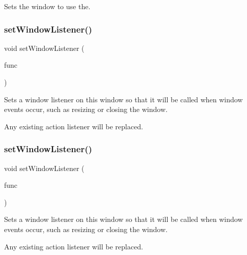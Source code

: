Sets the window to use the. 

\mbox{\label{classGWindow_adbb687462d07ac5bd49f3861e4356838}} 
\subsubsection{\texorpdfstring{set\+Window\+Listener()}{setWindowListener()}\hspace{0.1cm}{\footnotesize\ttfamily [1/2]}}
{\footnotesize\ttfamily void set\+Window\+Listener (\begin{DoxyParamCaption}\item[{G\+Event\+Listener}]{func }\end{DoxyParamCaption})\hspace{0.3cm}{\ttfamily [virtual]}}



Sets a window listener on this window so that it will be called when window events occur, such as resizing or closing the window. 

Any existing action listener will be replaced. \mbox{\label{classGWindow_a58b90463b205519917d5f68bdf068815}} 
\subsubsection{\texorpdfstring{set\+Window\+Listener()}{setWindowListener()}\hspace{0.1cm}{\footnotesize\ttfamily [2/2]}}
{\footnotesize\ttfamily void set\+Window\+Listener (\begin{DoxyParamCaption}\item[{G\+Event\+Listener\+Void}]{func }\end{DoxyParamCaption})\hspace{0.3cm}{\ttfamily [virtual]}}



Sets a window listener on this window so that it will be called when window events occur, such as resizing or closing the window. 

Any existing action listener will be replaced. \mbox{\label{classGWindow_a1c06b2b64d56394d6d77aa5b627910e2}} 
